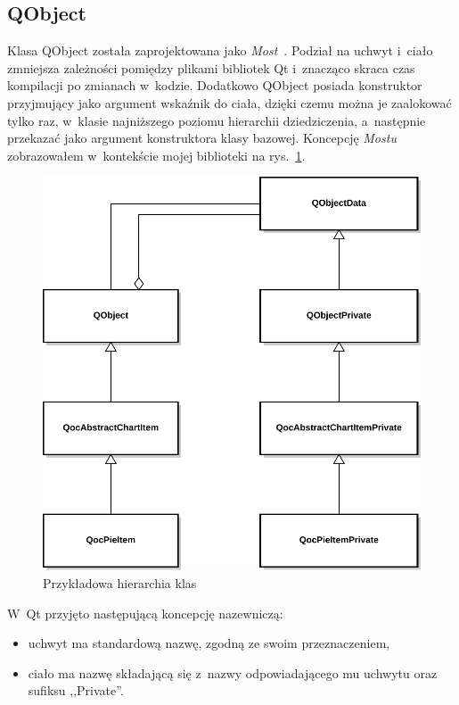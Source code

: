 \subsection{QObject}
Klasa QObject została zaprojektowana jako \textit{Most}~\cite{Patterns}.
Podział na uchwyt i~ciało zmniejsza zależności pomiędzy plikami bibliotek Qt i~znacząco skraca czas kompilacji po zmianach w~kodzie. Dodatkowo QObject posiada konstruktor przyjmujący jako argument wskaźnik do ciała, dzięki czemu można je zaalokować tylko raz, w~klasie najniższego poziomu hierarchii dziedziczenia, a~następnie przekazać jako argument konstruktora klasy bazowej. 
Koncepcję \textit{Mostu} zobrazowałem w~kontekście mojej biblioteki na rys.~\ref{rys:dpointer}.\newline

\begin{figure}[H]
\centering
\includegraphics[scale=0.8]{img/dpointer.pdf}
\caption{Przykładowa hierarchia klas}\label{rys:dpointer}
\end{figure}

W~Qt przyjęto następującą koncepcję nazewniczą:
\begin{itemize}
\item{uchwyt ma standardową nazwę, zgodną ze swoim przeznaczeniem,}
\item{ciało ma nazwę składającą się z~nazwy odpowiadającego mu uchwytu oraz sufiksu ,,Private''.}
\end{itemize}


